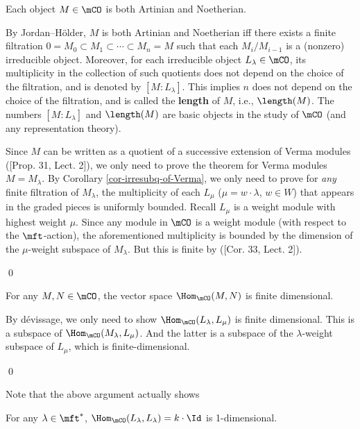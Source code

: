 	\begin{thm}
		Each object $M\in \mCO$ is both Artinian and Noetherian.
	\end{thm}

	\begin{rem}
		By Jordan--Hölder, $M$ is both Artinian and Noetherian iff there exists a finite filtration $0=M_0 \subset M_1 \subset\cdots\subset M_n=M$ such that each $M_i/M_{i-1}$ is a (nonzero) irreducible object. Moreover, for each irreducible object $L_\lambda \in \mCO$, its multiplicity in the collection of such quotients does not depend on the choice of the filtration, and is denoted by $[M: L_\lambda]$. This implies $n$ does not depend on the choice of the filtration, and is called the \textbf{length} of $M$, i.e., $\length(M)$. The numbers $[M: L_\lambda]$ and $\length(M)$ are basic objects in the study of $\mCO$ (and any representation theory).

	\end{rem}

	\proof
		Since $M$ can be written as a quotient of a successive extension of Verma modules ([Prop. 31, Lect. 2]), we only need to prove the theorem for Verma modules $M=M_\lambda$. By Corollary \ref{cor-irresubq-of-Verma}, we only need to prove for \emph{any} finite filtration of $M_\lambda$, the multiplicity of each $L_\mu$ ($\mu=w\cdot \lambda$, $w\in W$) that appears in the graded pieces is uniformly bounded. Recall $L_\mu$ is a weight module with highest weight $\mu$. Since any module in $\mCO$ is a weight module (with respect to the $\mft$-action), the aforementioned multiplicity is bounded by the dimension of the $\mu$-weight subspace of $M_\lambda$. But this is finite by ([Cor. 33, Lect. 2]).

	\qed

	\begin{prop}
		For any $M, N\in \mCO$, the vector space $\Hom_\mCO(M,N)$ is finite dimensional.
	\end{prop}

	\proof
		By dévissage, we only need to show $\Hom_\mCO(L_\lambda,L_\mu)$ is finite dimensional. This is a subspace of $\Hom_\mCO(M_\lambda,L_\mu)$. And the latter is a subspace of the $\lambda$-weight subspace of $L_\mu$, which is finite-dimensional.

	\qed

	Note that the above argument actually shows

	\begin{lem}
		For any $\lambda \in \mft^*$, $\Hom_\mCO(L_\lambda,L_\lambda) = k\cdot \Id$ is 1-dimensional.
	\end{lem}

